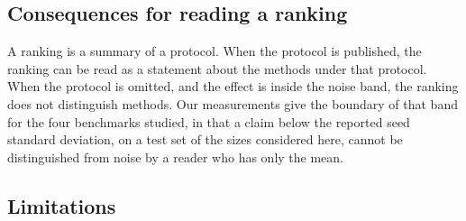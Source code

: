 \documentclass[pdflatex,sn-nature]{sn-jnl}
\begin{document}
\subsection{Consequences for reading a ranking}\label{sec:reading}

A ranking is a summary of a protocol. When the protocol is published, the ranking can be read as a statement about the methods under that protocol. When the protocol is omitted, and the effect is inside the noise band, the ranking does not distinguish methods. Our measurements give the boundary of that band for the four benchmarks studied, in that a claim below the reported seed standard deviation, on a test set of the sizes considered here, cannot be distinguished from noise by a reader who has only the mean.

\subsection{Limitations}\label{sec:limitations}
\end{document}
